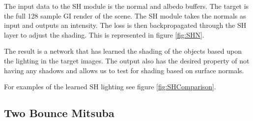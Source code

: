 The input data to the SH module is the normal and albedo buffers.  The target is the full 128 sample GI render of the scene.  The SH module takes the normals as input and outputs an intensity.   The loss is then backpropagated through the SH layer to adjust the shading. This is represented in figure \ref{fig:SHN}.

The result is a network that has learned the shading of the objects based upon the lighting in the target images.  The output also has the desired property of not having any shadows and allows us to test for shading based on surface normals.

For examples of the learned SH lighting see figure \ref{fig:SHComparison}.



\subsection{Two Bounce Mitsuba}\label{sec:2bounce}

